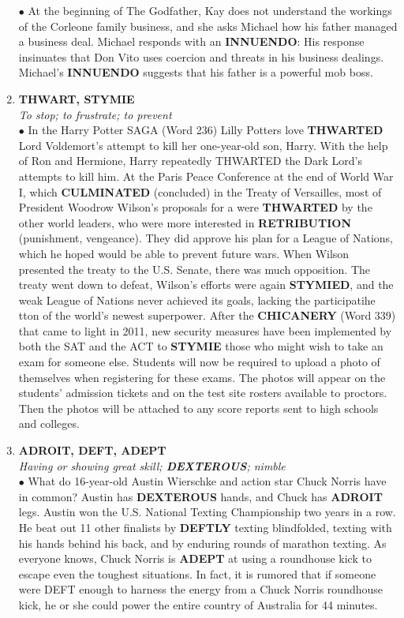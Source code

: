 \documentclass{book}
\begin{document}
\begin{enumerate}
$\bullet$ At the beginning of The Godfather,  Kay does not understand the workings of the Corleone family business, and she asks Michael how his father managed a business deal. Michael responds with an \textbf{INNUENDO}:  His response insinuates that Don Vito uses coercion and threats in his business dealings. Michael's \textbf{INNUENDO} suggests that his father is a powerful mob boss. 

\item\textbf{ THWART, STYMIE}\\
 \textit{To stop; to frustrate; to prevent}\\
 
 $\bullet$ In the Harry Potter SAGA (Word 236) Lilly Potters love \textbf{THWARTED} Lord Voldemort's attempt to kill her one-year-old son, Harry. With the help of Ron and Hermione, Harry repeatedly THWARTED the Dark Lord's attempts to kill him.  At the Paris Peace Conference at the end of World War I, which \textbf{CULMINATED} (concluded) in the Treaty of Versailles, most of President Woodrow Wilson's proposals for a  were \textbf{THWARTED} by the other world leaders, who were more interested in \textbf{RETRIBUTION} (punishment, vengeance). They did approve his plan for a League of Nations, which he hoped would be able to prevent future wars. When Wilson presented the treaty to the U.S. Senate, there was much opposition. The treaty went down to defeat, Wilson's efforts were again \textbf{STYMIED}, and the weak League of Nations never achieved its goals, lacking the participatihe tton of the world’s newest superpower.  After the \textbf{CHICANERY} (Word 339) that came to light in 2011, new security measures have been implemented by both the SAT and the ACT to \textbf{STYMIE} those who might wish to take an exam for someone else. Students will now be required to upload a photo of themselves when registering for these exams. The photos will appear on the students' admission tickets and on the test site rosters available to proctors. Then the photos will be attached to any score reports sent to high schools and colleges. 
 
\item \textbf{ADROIT, DEFT, ADEPT}\\
\textit{ Having or showing great skill; \textbf{DEXTEROUS}; nimble}\\

$\bullet$ What do 16-year-old Austin Wierschke and action star Chuck Norris have in common? Austin has \textbf{DEXTEROUS} hands, and Chuck has \textbf{ADROIT} legs. Austin won the U.S. National Texting Championship two years in a row. He beat out 11 other finalists by \textbf{DEFTLY} texting blindfolded, texting with his hands behind his back, and by enduring rounds of marathon texting. As everyone knows, Chuck Norris is \textbf{ADEPT} at using a roundhouse kick to escape even the toughest situations. In fact, it is rumored that if someone were DEFT enough to harness the energy from a Chuck Norris roundhouse kick, he or she could power the entire country of Australia for 44 minutes. 


\end{enumerate}
\end{document}
